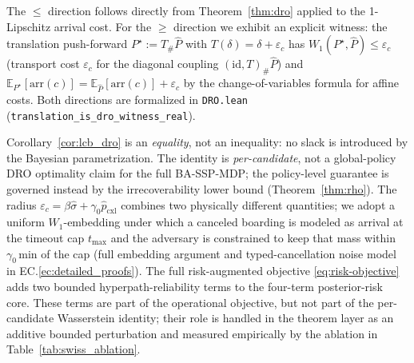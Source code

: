 \documentclass[opre,dblanonrev]{informs4}
\renewenvironment{proof}{\Trivlist\item[\hspace*{1em}\hskip\labelsep{\itshape Proof.\enskip}]\ignorespaces}{\endTrivlist\addvspace{0pt}}
\begin{document}
\begin{proof}[Proof sketch (full proof in EC.\ref{ec:detailed_proofs}).]
The $\leq$ direction follows directly from Theorem~\ref{thm:dro}
applied to the 1-Lipschitz arrival cost. For the $\geq$ direction we
exhibit an explicit witness: the translation push-forward
$P^\star := T_\#\hat{P}$ with $T(\delta)=\delta+\varepsilon_c$ has
$W_1(P^\star,\hat P)\leq\varepsilon_c$ (transport cost
$\varepsilon_c$ for the diagonal coupling
$(\mathrm{id},T)_\#\hat P$) and
$\mathbb{E}_{P^\star}[\mathrm{arr}(c)] =
\mathbb{E}_{\hat P}[\mathrm{arr}(c)]+\varepsilon_c$ by the
change-of-variables formula for affine costs. Both directions are
formalized in \texttt{DRO.lean}
(\texttt{translation\_is\_dro\_\allowbreak witness\_real}).
\end{proof}

\begin{remark}\label{rem:lcb_dro_scope}
Corollary~\ref{cor:lcb_dro} is an \emph{equality}, not an inequality:
no slack is introduced by the Bayesian parametrization. The
identity is \emph{per-candidate}, not a global-policy DRO
optimality claim for the full BA-SSP-MDP; the policy-level
guarantee is governed instead by the irrecoverability lower bound
(Theorem~\ref{thm:rho}). The radius
$\varepsilon_c = \beta\hat\sigma + \gamma_0\hat p_{\mathrm{cxl}}$
combines two physically different quantities; we adopt a uniform
$W_1$-embedding under which a canceled boarding is modeled as
arrival at the timeout cap $t_{\max}$ and the adversary is
constrained to keep that mass within $\gamma_0$\,min of the cap
(full embedding argument and typed-cancellation noise model in
EC.\ref{ec:detailed_proofs}). The full risk-augmented objective
\eqref{eq:risk-objective} adds two bounded hyperpath-reliability
terms to the four-term posterior-risk core. These terms are part of
the operational objective, but not part of the per-candidate
Wasserstein identity; their role is handled in the theorem layer as
an additive bounded perturbation and measured empirically by the
ablation in Table~\ref{tab:swiss_ablation}.
\end{remark}
\end{document}
